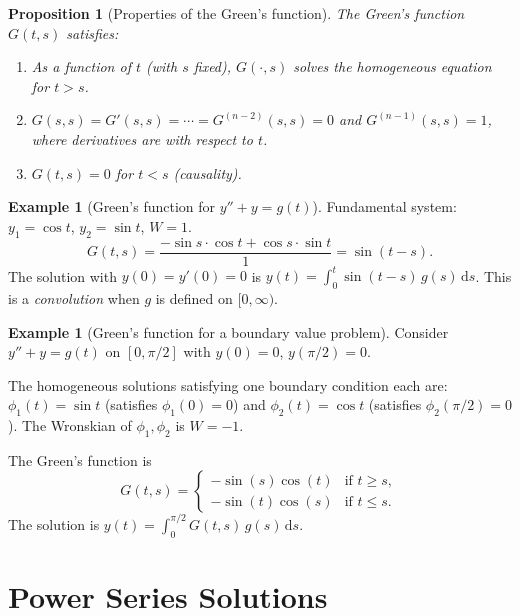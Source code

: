 \documentclass[12pt,a4paper,openany]{book}
\theoremstyle{definition}
\newtheorem{example}[definition]{Example}
\theoremstyle{plain}
\newtheorem{proposition}[definition]{Proposition}
\theoremstyle{remark}
\newcommand{\dd}{\mathrm{d}}
\begin{document}
\begin{proposition}[Properties of the Green's function]\label{prop:green-props}
The Green's function $G(t,s)$ satisfies:
\begin{enumerate}[label=(\roman*)]
  \item As a function of $t$ (with $s$ fixed), $G(\cdot,s)$ solves the
    homogeneous equation for $t>s$.
  \item $G(s,s)=G'(s,s)=\cdots=G^{(n-2)}(s,s)=0$ and $G^{(n-1)}(s,s)=1$,
    where derivatives are with respect to $t$.
  \item $G(t,s)=0$ for $t<s$ (causality).
\end{enumerate}
\end{proposition}

\begin{example}[Green's function for $y''+y=g(t)$]\label{ex:green-2nd}
Fundamental system: $y_1=\cos t$, $y_2=\sin t$, $W=1$.
\[
  G(t,s) = \frac{-\sin s\cdot\cos t + \cos s\cdot\sin t}{1}
         = \sin(t-s).
\]
The solution with $y(0)=y'(0)=0$ is
$y(t)=\int_0^t\sin(t-s)\,g(s)\,\dd s$.
This is a \emph{convolution} when $g$ is defined on $[0,\infty)$.
\end{example}

\begin{example}[Green's function for a boundary value problem]\label{ex:green-bvp}
Consider $y''+y=g(t)$ on $[0,\pi/2]$ with $y(0)=0$, $y(\pi/2)=0$.

The homogeneous solutions satisfying one boundary condition each are:
$\phi_1(t)=\sin t$ (satisfies $\phi_1(0)=0$) and
$\phi_2(t)=\cos t$ (satisfies $\phi_2(\pi/2)=0$).
The Wronskian of $\phi_1,\phi_2$ is $W=-1$.

The Green's function is
\[
  G(t,s) = \begin{cases}
    -\sin(s)\cos(t) & \text{if } t\ge s, \\
    -\sin(t)\cos(s) & \text{if } t\le s.
  \end{cases}
\]
The solution is $y(t)=\int_0^{\pi/2}G(t,s)\,g(s)\,\dd s$.
\end{example}

\section{Power Series Solutions}\label{sec:power-series}
\end{document}
